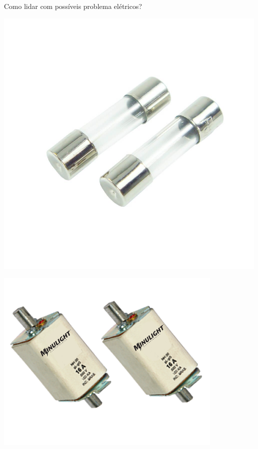 \begin{frame}{Como lidar com possíveis problema elétricos?}
	\begin{minipage}{0.45\linewidth}
		\centering
		\includegraphics[width=\linewidth]{Figuras/Ch05/fig10.jpg}
	\end{minipage}
	\hfill
	\begin{minipage}{0.45\linewidth}
		\centering
		\includegraphics[width=\linewidth]{Figuras/Ch05/fig11.png}
	\end{minipage}
\end{frame}


